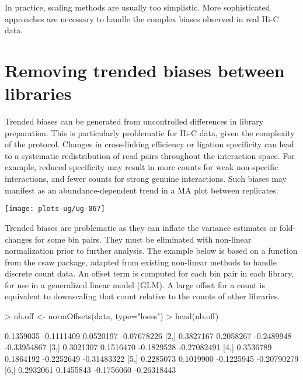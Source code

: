 \documentclass[12pt]{report}
\renewenvironment{Schunk}{\vspace{0pt}}{\vspace{0pt}}
\newcommand{\csaw}{csaw}
\begin{document}
In practice, scaling methods are usually too simplistic.
More sophisticated approaches are necessary to handle the complex biases observed in real Hi-C data.

\section{Removing trended biases between libraries}
Trended biases can be generated from uncontrolled differences in library preparation. 
This is particularly problematic for Hi-C data, given the complexity of the protocol. 
Changes in cross-linking efficiency or ligation specificity can lead to a systematic redistribution of read pairs throughout the interaction space. 
For example, reduced specificity may result in more counts for weak non-specific interactions, and fewer counts for strong genuine interactions.
Such biases may manifest as an abundance-dependent trend in a MA plot between replicates.



\begin{Schunk}
\end{Schunk}

\begin{center}
\texttt{[image: plots-ug/ug-067]}
\end{center}

Trended biases are problematic as they can inflate the variance estimates or fold-changes for some bin pairs. 
They must be eliminated with non-linear normalization prior to further analysis.
The example below is based on a function from the \csaw{} package, adapted from existing non-linear methods to handle discrete count data. %
An offset term is computed for each bin pair in each library, for use in a generalized linear model (GLM). 
A large offset for a count is equivalent to downscaling that count relative to the counts of other libraries. 

\begin{Schunk}
\begin{Sinput}
> nb.off <- normOffsets(data, type="loess")
> head(nb.off)
\end{Sinput}
\begin{Soutput}
          [,1]       [,2]       [,3]        [,4]
[1,] 0.1359035 -0.1111409  0.0520197 -0.07678226
[2,] 0.3827167  0.2058267 -0.2489948 -0.33954867
[3,] 0.3021307  0.1516470 -0.1829528 -0.27082491
[4,] 0.3536789  0.1864192 -0.2252649 -0.31483322
[5,] 0.2285073  0.1019900 -0.1225945 -0.20790279
[6,] 0.2932061  0.1455843 -0.1756060 -0.26318443
\end{Soutput}
\end{Schunk}
\end{document}
